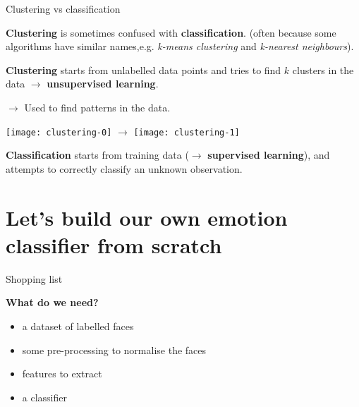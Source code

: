\documentclass[compress,xcolor=table]{beamer}
\begin{document}
\begin{frame}{Clustering vs classification}

\textbf{Clustering} is sometimes confused with \textbf{classification}.  (often
    because some algorithms have similar names,e.g. \emph{k-means clustering}
    and \emph{k-nearest neighbours}).

\textbf{Clustering} starts from unlabelled data points and tries to find
    $k$ clusters in the data $\rightarrow$ \textbf{unsupervised learning}.


$\rightarrow$ Used to find patterns in the data.

    \begin{center}
        \texttt{[image: clustering-0]}
        $\rightarrow$
        \texttt{[image: clustering-1]}
    \end{center}


    \textbf{Classification} starts from training data ($\rightarrow$
    \textbf{supervised learning}), and attempts to correctly classify an
    unknown observation.

\end{frame}



\section[Emotion classifier]{Let's build our own emotion classifier from scratch}

\begin{frame}{Shopping list}

    \begin{center}
        {\bf What do we need?}
    \end{center}

    \pause

    \begin{itemize}
        \item<+-> a dataset of labelled faces
        \item<+-> some pre-processing to normalise the faces
        \item<+-> features to extract
        \item<+-> a classifier
    \end{itemize}
\end{frame}
\end{document}
